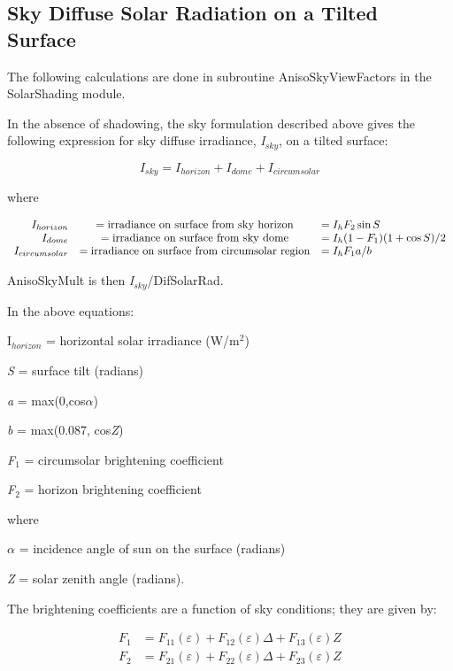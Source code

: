 \subsection{Sky Diffuse Solar Radiation on a Tilted Surface}\label{sky-diffuse-solar-radiation-on-a-tilted-surface}

The following calculations are done in subroutine AnisoSkyViewFactors in the SolarShading module.

In the absence of shadowing, the sky formulation described above gives the following expression for sky diffuse irradiance, \emph{I\(_{sky}\)}, on a tilted surface:

\begin{equation}
{I_{sky}} = {I_{horizon}} + {I_{dome}} + {I_{circumsolar}}
\end{equation}

where

\begin{equation}
\begin{array}{rcl}
    I_{horizon} & = \rm{irradiance~on~surface~from~sky~horizon} & = I_h F_2\sin S \\
    I_{dome}    & = \rm{irradiance~on~surface~from~sky~dome}    & = I_h (1 - F_1)(1 + \cos S)/2 \\
    I_{circumsolar} & = \rm{irradiance~on~surface~from~circumsolar~region} & = I_h F_1 a/b
\end{array}
\end{equation}

AnisoSkyMult is then \emph{I\(_{sky}\)}/DifSolarRad.

In the above equations:

I\(_{horizon}\) = horizontal solar irradiance (W/m\(^{2}\))

\emph{S} = surface tilt (radians)

\emph{a} = max(0,cos\emph{$\alpha$})

\emph{b} = max(0.087, cos\emph{Z})

\emph{F\(_{1}\)} = circumsolar brightening coefficient

\emph{F\(_{2}\)} = horizon brightening coefficient

where

\emph{$\alpha$} = incidence angle of sun on the surface (radians)

\emph{Z} = solar zenith angle (radians).

The brightening coefficients are a function of sky conditions; they are given by:

\begin{equation}
\begin{array}{rl}
    F_1 & = F_{11}(\varepsilon ) + F_{12}(\varepsilon )\Delta  + F_{13}(\varepsilon )Z  \\
    F_2 & = F_{21}(\varepsilon ) + F_{22}(\varepsilon )\Delta  + F_{23}(\varepsilon )Z
\end{array}
\end{equation}

